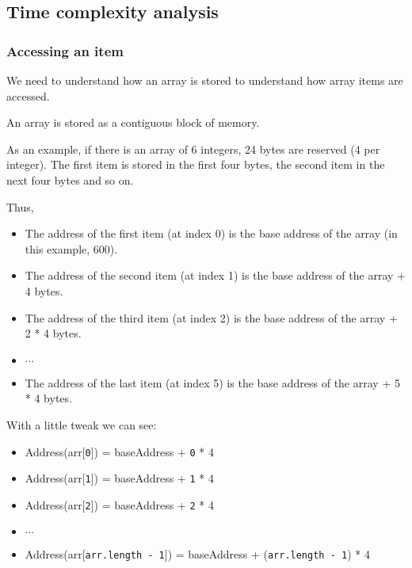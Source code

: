 \newpage

\subsection{Time complexity analysis}

\subsubsection{Accessing an item}

We need to understand how an array is stored to understand how array items are accessed.

An array is stored as a contiguous block of memory. 

As an example, if there is an array of 6 integers, 24 bytes are reserved (4 per integer). The first item is stored in the first four bytes, the second item in the next four bytes and so on.

\bgroup \tikzset{png export}  \egroup

Thus,
\begin{itemize}
  \item The address of the first item (at index 0) is the base address of the array (in this example, 600).
  \item The address of the second item (at index 1) is the base address of the array + 4 bytes.
  \item The address of the third item (at index 2) is the base address of the array + 2 * 4 bytes.
  \item $\cdots$  
  \item The address of the last item (at index 5) is the base address of the array + 5 * 4 bytes.
\end{itemize}

With a little tweak we can see:

\begin{itemize}
  \item Address(arr[\texttt{0}]) = baseAddress + \texttt{0} * 4
  \item Address(arr[\texttt{1}]) = baseAddress + \texttt{1} * 4
  \item Address(arr[\texttt{2}]) = baseAddress + \texttt{2} * 4
  \item $\cdots$  
  \item Address(arr[\texttt{arr.length - 1}]) = baseAddress + (\texttt{arr.length - 1}) * 4
\end{itemize}

